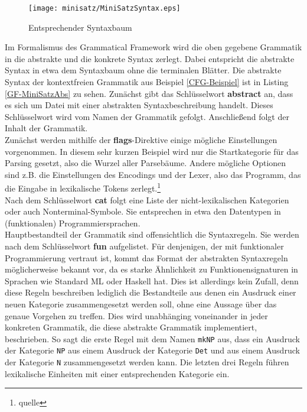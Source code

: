 \documentclass[11pt]{scrartcl}
\begin{document}
\begin{figure}[h]
\texttt{[image: minisatz/MiniSatzSyntax.eps]}
\caption{Entsprechender Syntaxbaum}\label{CFG-Syntaxbaum}
\end{figure}
Im Formalismus des Grammatical Framework wird die oben gegebene Grammatik in die abstrakte und die konkrete Syntax zerlegt.
Dabei entspricht die abstrakte Syntax in etwa dem Syntaxbaum ohne die terminalen Blätter. Die abstrakte Syntax der kontextfreien Grammatik aus Beispiel \ref{CFG-Beispiel} ist in Listing \ref{GF-MiniSatzAbs} zu sehen. Zunächst gibt das Schlüsselwort \textbf{abstract} an, dass es sich um Datei mit einer abstrakten Syntaxbeschreibung handelt. Dieses Schlüsselwort wird vom Namen der Grammatik gefolgt. Anschließend folgt der Inhalt der Grammatik. \\
Zunächst werden mithilfe der \textbf{flags}-Direktive einige mögliche Einstellungen vorgenommen. In diesem sehr kurzen Beispiel wird nur die Startkategorie für das Parsing gesetzt, also die Wurzel aller Parsebäume. Andere mögliche Optionen sind z.B. die Einstellungen des Encodings und der Lexer, also das Programm, das die Eingabe in lexikalische Tokens zerlegt.\footnote{quelle} \\
Nach dem Schlüsselwort \textbf{cat} folgt eine Liste der nicht-lexikalischen Kategorien oder auch Nonterminal-Symbole. Sie entsprechen in etwa den Datentypen in (funktionalen) Programmiersprachen. \\
Hauptbestandteil der Grammatik sind offensichtlich die Syntaxregeln. Sie werden nach dem Schlüsselwort \textbf{fun} aufgelistet. Für denjenigen, der mit funktionaler Programmierung vertraut ist, kommt das Format der abstrakten Syntaxregeln möglicherweise bekannt vor, da es starke Ähnlichkeit zu Funktionensignaturen in Sprachen wie Standard ML oder Haskell hat. Dies ist allerdings kein Zufall, denn diese Regeln beschreiben lediglich die Bestandteile aus denen ein Ausdruck einer neuen Kategorie zusammengesetzt werden soll, ohne eine Aussage über das genaue Vorgehen zu treffen. Dies wird unabhänging voneinander in jeder konkreten Grammatik, die diese abstrakte Grammatik implementiert, beschrieben. So sagt die erste Regel mit dem Namen \texttt{mkNP} aus, dass ein Ausdruck der Kategorie \texttt{NP} aus einem Ausdruck der Kategorie \texttt{Det} und aus einem Ausdruck der Kategorie \texttt{N} zusammengesetzt werden kann. Die letzten drei Regeln führen lexikalische Einheiten mit einer entsprechenden Kategorie ein. \\
\end{document}
